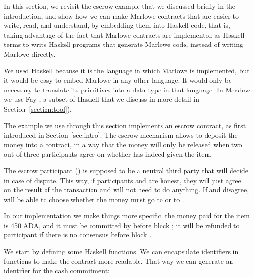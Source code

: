 \documentclass[runningheads]{llncs}
\begin{document}
In this section, we revisit the escrow example that we discussed briefly in the introduction, and show how we can make 
Marlowe contracts that are easier to write, read, and understand, by embedding them into Haskell code, that is, taking 
advantage of the fact that Marlowe contracts are implemented as Haskell terms to write Haskell programs that generate 
Marlowe code, instead of writing Marlowe directly.

We used Haskell because it is the language in which Marlowe is implemented, but it would be easy to embed Marlowe in any 
other language. It would only be necessary to translate its primitives into a data type in that language. In Meadow we 
use Fay \cite{Fay}, a subset of Haskell that we discuss in more detail in Section~\ref{section:tool}).

The example we use through this section implements an escrow contract, as first introduced in Section~\ref{sec:intro}. 
%
%
The escrow mechanism allows  to deposit the money into a contract, in a way that the 
money will only be released when two out of three participants agree on whether  has indeed 
given  the item. 

The escrow participant () is supposed to be a neutral third party that will decide in case of 
dispute. This way, if participants  and  are honest, they will just agree on 
the result of the transaction and  will not need to do anything. If  and 
 disagree,  will be able to choose whether the money must go to 
 or to .

In our implementation we make things more specific: the money paid for the item is 450 ADA, and it must be committed by 
 before block ; it will be refunded to participant  if 
there is no consensus before block .

We start by defining some Haskell functions. We can encapsulate identifiers in functions to make the contract more 
readable. That way we can generate an identifier for the cash commitment:
\end{document}
